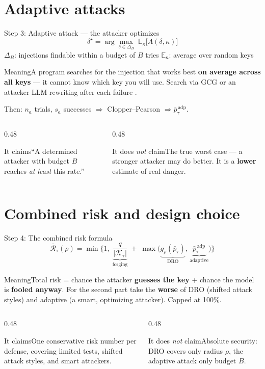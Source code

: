 \documentclass[aspectratio=169,11pt]{beamer}
\newcommand{\K}{\mathcal{K}_\tau}
\newcommand{\pbar}{\bar p_\tau}
\newcommand{\padp}{\bar p^{\,\mathrm{adp}}_\tau}
\newcommand{\plain}[1]{\begin{block}{Meaning}#1\end{block}}
\newcommand{\claims}[2]{%
  \begin{columns}[T]
    \begin{column}{0.48\textwidth}
      \begin{exampleblock}{It claims}#1\end{exampleblock}
    \end{column}
    \begin{column}{0.48\textwidth}
      \begin{alertblock}{It does \emph{not} claim}#2\end{alertblock}
    \end{column}
  \end{columns}}
\begin{document}
\section{Adaptive attacks}

\begin{frame}{Step 3: Adaptive attack --- the attacker optimizes}
  \[
    \delta^\star = \arg\max_{\delta \in \Delta_B} \; \mathbb{E}_{\kappa}\big[A(\delta,\kappa)\big]
  \]
  \small
  $\Delta_B$: injections findable within a budget of $B$ tries \quad $\mathbb{E}_\kappa$: average over random keys
  \plain{A program searches for the injection that works best \textbf{on average across all keys} --- it cannot know which key you will use. Search via GCG \cite{zou2023gcg} or an attacker LLM rewriting after each failure \cite{chao2023pair}.}
  Then: $n_a$ trials, $s_a$ successes $\Rightarrow$ Clopper--Pearson $\Rightarrow \padp$.
  \claims{``A determined attacker with budget $B$ reaches \emph{at least} this rate.''}
  {The true worst case --- a stronger attacker may do better. It is a \textbf{lower} estimate of real danger.}
\end{frame}


\section{Combined risk and design choice}

\begin{frame}{Step 4: The combined risk formula}
  \[
    \boxed{\;
    \bar{\mathcal{R}}_\tau(\rho) = \min\Bigg\{1,\;
    \underbrace{\frac{q}{|\K|}}_{\text{forging}}
    \;+\; \max\!\Big(\underbrace{g_\rho(\pbar)}_{\text{DRO}},\, \underbrace{\padp}_{\text{adaptive}}\Big)
    \Bigg\}\;}
  \]
  \small
  \plain{Total risk = chance the attacker \textbf{guesses the key} + chance the model is \textbf{fooled anyway}. For the second part take the \textbf{worse} of DRO (shifted attack styles) and adaptive (a smart, optimizing attacker). Capped at 100\%.}
  \claims{One conservative risk number per defense, covering limited tests, shifted attack styles, and smart attackers.}
  {Absolute security: DRO covers only radius $\rho$, the adaptive attack only budget $B$.}
\end{frame}
\end{document}
